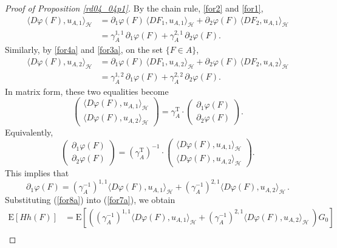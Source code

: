 \documentclass[12pt,a4paper]{article}
\newcommand{\E}{\mathrm{E}}
\newcommand{\HH}{\mathcal{H}}
\newcommand{\rT}{\text{T}}
\newcommand{\<}{\langle}
\renewcommand{\>}{\rangle}
\begin{document}
\begin{proof}[Proof of Proposition \ref{rd04_04p1}]
 By the chain rule, \eqref{for2} and \eqref{for1},
\begin{align*}
    \langle D\varphi(F), u_{A,1} \rangle_\HH & = \partial_1 \varphi(F)\, \langle  DF_1, u_{A,1} \rangle_\HH + \partial_2\varphi(F) \, \langle  DF_2, u_{A,1} \rangle_\HH \\
     &=  \gamma_A^{1,1}\,  \partial_1 \varphi(F) + \gamma_A^{2,1}\,  \partial_2\varphi(F) .
 \end{align*}
Similarly, by \eqref{for4a} and \eqref{for3a}, on the set $\{F\in A\}$,
\begin{align*}
    \langle D\varphi(F), u_{A,2} \rangle_\HH & = \partial_1 \varphi(F)\, \langle  DF_1, u_{A,2} \rangle_\HH + \partial_2\varphi(F) \, \langle  DF_2, u_{A,2} \rangle_\HH \\
     &=  \gamma_A^{1,2}\,  \partial_1 \varphi(F) + \gamma_A^{2,2}\,  \partial_2\varphi(F) .
 \end{align*}
 In matrix form, these two equalities become
   \[
    \left(\begin{array}{cc}
    \langle D \varphi(F), u_{A,1}\rangle_\HH \\ \langle D  \varphi(F), u_{A,2}\rangle_\HH
           \end{array} \right) = \gamma_A^\rT \cdot \left(\begin{array}{cc}
           \partial_{1} \varphi(F) \\  \partial_{2} \varphi(F) \end{array} \right).
   \]
Equivalently, 
   \[  
  \left(\begin{array}{cc}
           \partial_{1} \varphi(F) \\  \partial_{2} \varphi(F) \end{array} \right) = (\gamma_A^\rT)^{-1} \cdot 
           \left(\begin{array}{cc}  \langle D \varphi(F), u_{A,1}\rangle_\HH \\ \langle D  \varphi(F), u_{A,2}\rangle_\HH
           \end{array} \right).
   \]
This implies that
\begin{equation} \label{for8a}
 \partial_1\varphi(F) = (\gamma_A^{-1})^{1,1} \langle D\varphi(F), u_{A,1} \rangle_\HH + (\gamma_A^{-1})^{2,1} \langle D\varphi(F), u_{A,2} \rangle_\HH\, .
 \end{equation}
 Substituting (\ref{for8a}) into (\ref{for7a}), we obtain
 \begin{align*}
   \E[H h(F)] &=
   \E \left[ \left((\gamma_A^{-1})^{1,1} \langle D\varphi(F), u_{A,1} \rangle_\HH + (\gamma_A^{-1})^{2,1} \langle D\varphi(F), u_{A,2} \rangle_\HH\ \right)  G_0 \right] \\

\end{align*}
\end{proof}
\end{document}
